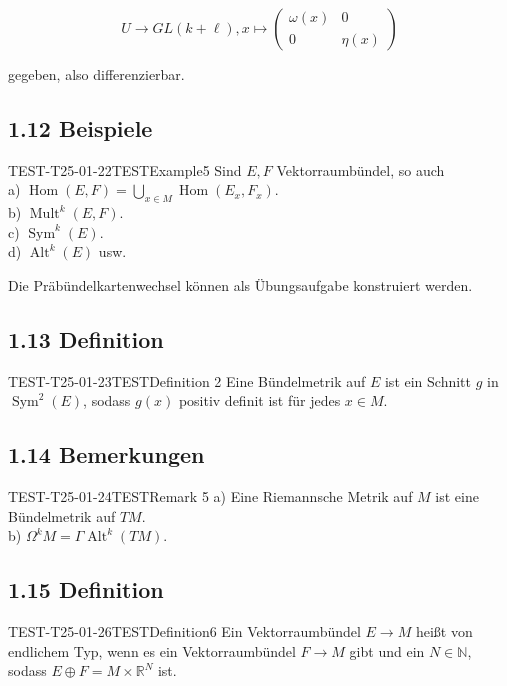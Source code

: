$$
U \rightarrow G L(k+\ell), x \mapsto\left(\begin{array}{cc}
\omega(x) & 0 \\
0 & \eta(x)
\end{array}\right)
$$

gegeben, also differenzierbar.


\subsection*{1.12 Beispiele}
\begin{EXA}{TEST-T25-01-22}{TESTExample5}
Sind $E, F$ Vektorraumbündel, so auch\\
a) $\operatorname{Hom}(E, F)=\bigcup_{x \in M} \operatorname{Hom}\left(E_{x}, F_{x}\right)$.\\
b) $\operatorname{Mult}^{k}(E, F)$.\\
c) $\operatorname{Sym}^{k}(E)$.\\
d) $\operatorname{Alt}^{k}(E)$ usw.

Die Präbündelkartenwechsel können als Übungsaufgabe konstruiert werden.
\end{EXA}

\subsection*{1.13 Definition}
\begin{DEF}{TEST-T25-01-23}{TESTDefinition 2}
Eine Bündelmetrik auf $E$ ist ein Schnitt $g$ in $\operatorname{Sym}^{2}(E)$, sodass $g(x)$ positiv definit ist für jedes $x \in M$.
\end{DEF}

\subsection*{1.14 Bemerkungen}
\begin{REM}{TEST-T25-01-24}{TESTRemark 5}
a) Eine Riemannsche Metrik auf $M$ ist eine Bündelmetrik auf $T M$.\\
b) $\Omega^{k} M=\Gamma \operatorname{Alt}^{k}(T M)$.
\end{REM}

\subsection*{1.15 Definition}
\begin{EXA}{TEST-T25-01-26}{TESTDefinition6}
Ein Vektorraumbündel $E \rightarrow M$ heißt von endlichem Typ, wenn es ein Vektorraumbündel $F \rightarrow M$ gibt und ein $N \in \mathbb{N}$, sodass $E \oplus F=M \times \mathbb{R}^{N}$ ist.
\end{EXA}

